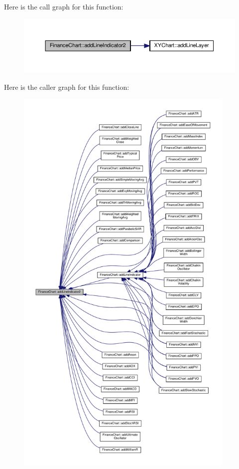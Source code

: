 Here is the call graph for this function\+:
\nopagebreak
\begin{figure}[H]
\begin{center}
\leavevmode
\includegraphics[width=350pt]{class_finance_chart_af7000f18368de197ff56bf5dba1f711c_cgraph}
\end{center}
\end{figure}
Here is the caller graph for this function\+:
\nopagebreak
\begin{figure}[H]
\begin{center}
\leavevmode
\includegraphics[height=550pt]{class_finance_chart_af7000f18368de197ff56bf5dba1f711c_icgraph}
\end{center}
\end{figure}
\mbox{\label{class_finance_chart_a3f46f24c67ed7a2c4a5ffa77fbe7ba73}} 
